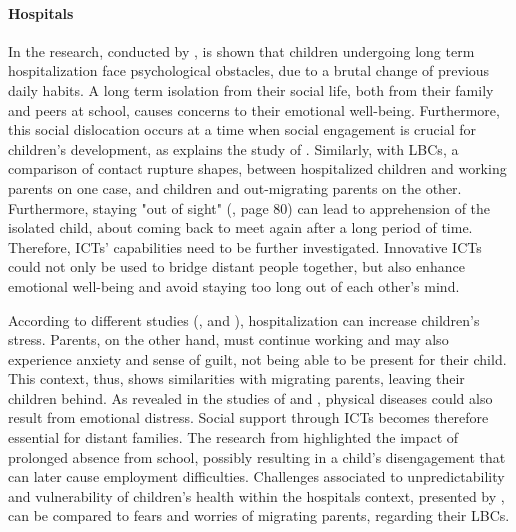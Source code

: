 
\vspace{4pt}
\paragraph{Hospitals}
In the research, conducted by \textcite{wadley2014exploring}, is shown that children undergoing long term hospitalization face psychological obstacles, due to a brutal change of previous daily habits. A long term isolation from their social life, both from their family and peers at school, causes concerns to their emotional well-being. Furthermore, this social dislocation occurs at a time when social engagement is crucial for children’s development, as explains the study of \textcite{hopkins2014embedding}. Similarly, with LBCs, a comparison of contact rupture shapes, between hospitalized children and working parents on one case, and children and out-migrating parents on the other. Furthermore, staying "out of sight" (\cite{yates2010keeping}, page 80) can lead to apprehension of the isolated child, about coming back to meet again after a long period of time. Therefore, ICTs' capabilities need to be further investigated. Innovative ICTs could not only be used to bridge distant people together, but also enhance emotional well-being and avoid staying too long out of each other's mind. 

According to different studies (\cite{vernon1971psychological}, \cite{bossert1994stress} and \cite{thomson2012body}), hospitalization can increase children's stress. Parents, on the other hand, must continue working and may also experience anxiety and sense of guilt, not being able to be present for their child. This context, thus, shows similarities with migrating parents, leaving their children behind. As revealed in the studies of \textcite{stewart1998emotional} and \textcite{ryan2001happiness}, physical diseases could also result from emotional distress. Social support through ICTs becomes therefore essential for distant families. The research from \textcite{hopkins2013hospitalised} highlighted the impact of prolonged absence from school, possibly resulting in a child’s disengagement that can later cause employment difficulties. Challenges associated to unpredictability and vulnerability of children’s health within the hospitals context, presented by \textcite{yates2010keeping} , can be compared to fears and worries of migrating parents, regarding their LBCs. 

